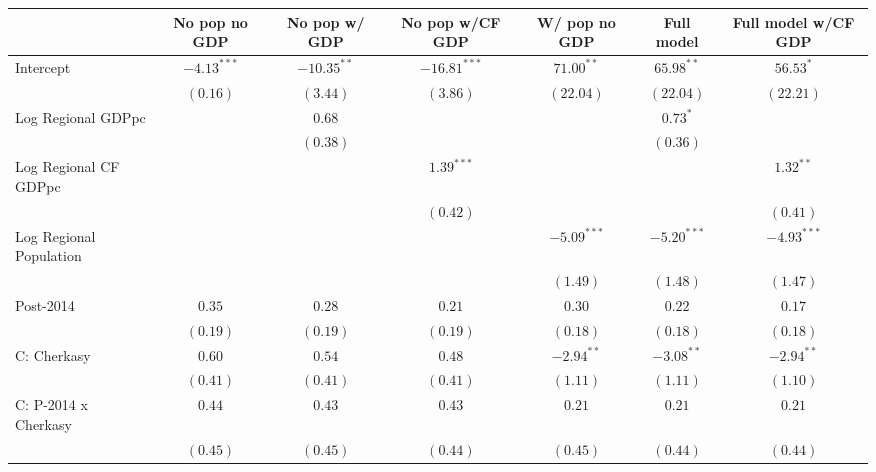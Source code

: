 
\begin{table}
\begin{center}
\begin{small}
\begin{tabular}{l c c c c c c}
\hline
 & No pop
no GDP & No pop
w/ GDP & No pop 
w/CF GDP & W/ pop
no GDP & Full model & Full model w/CF GDP \\
\hline
Intercept                   & $-4.13^{***}$ & $-10.35^{**}$ & $-16.81^{***}$ & $71.00^{**}$  & $65.98^{**}$  & $56.53^{*}$   \\
                            & $(0.16)$      & $(3.44)$      & $(3.86)$       & $(22.04)$     & $(22.04)$     & $(22.21)$     \\
Log Regional GDPpc          &               & $0.68$        &                &               & $0.73^{*}$    &               \\
                            &               & $(0.38)$      &                &               & $(0.36)$      &               \\
Log Regional CF GDPpc       &               &               & $1.39^{***}$   &               &               & $1.32^{**}$   \\
                            &               &               & $(0.42)$       &               &               & $(0.41)$      \\
Log Regional Population     &               &               &                & $-5.09^{***}$ & $-5.20^{***}$ & $-4.93^{***}$ \\
                            &               &               &                & $(1.49)$      & $(1.48)$      & $(1.47)$      \\
Post-2014                   & $0.35$        & $0.28$        & $0.21$         & $0.30$        & $0.22$        & $0.17$        \\
                            & $(0.19)$      & $(0.19)$      & $(0.19)$       & $(0.18)$      & $(0.18)$      & $(0.18)$      \\
C: Cherkasy                 & $0.60$        & $0.54$        & $0.48$         & $-2.94^{**}$  & $-3.08^{**}$  & $-2.94^{**}$  \\
                            & $(0.41)$      & $(0.41)$      & $(0.41)$       & $(1.11)$      & $(1.11)$      & $(1.10)$      \\
C: P-2014 x Cherkasy        & $0.44$        & $0.43$        & $0.43$         & $0.21$        & $0.21$        & $0.21$        \\
                            & $(0.45)$      & $(0.45)$      & $(0.44)$       & $(0.45)$      & $(0.44)$      & $(0.44)$      \\

\end{tabular}
\end{small}
\end{center}
\end{table}
